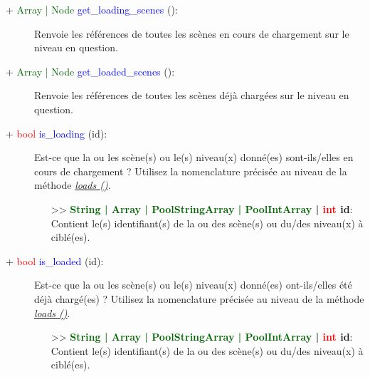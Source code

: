 \documentclass[a4paper, 11pt]{article}
\begin{document}
	\begin{description}
		\item [+ \textcolor{darkgreen}{Array | Node} \textcolor{blue}{get\_loading\_scenes} ():] Renvoie les
		références de toutes les scènes en cours de chargement sur le niveau en question.\\
	\end{description}
	\begin{description}
		\item [+ \textcolor{darkgreen}{Array | Node} \textcolor{blue}{get\_loaded\_scenes} ():] Renvoie les
		références de toutes les scènes déjà chargées sur le niveau en question.\\
	\end{description}
	\begin{description}
		\item [+ \textcolor{red}{bool} \textcolor{blue}{is\_loading} (id):] Est-ce que la ou les scène(s) ou 
		le(s) niveau(x) donné(es) sont-ils/elles en cours de chargement ? Utilisez la nomenclature précisée 
		au niveau de la méthode \textit{\hyperlink{load}{loads ()}}.
		\begin{itemize}
			\item [>> \textbf{\textcolor{darkgreen}{String | Array | PoolStringArray | PoolIntArray} |
			\textcolor{red}{int} id}:] Contient le(s) identifiant(s) de la ou des scène(s) ou du/des
			niveau(x) à ciblé(es).\\
		\end{itemize}
	\end{description}
	\begin{description}
		\item [+ \textcolor{red}{bool} \textcolor{blue}{is\_loaded} (id):] Est-ce que la ou les scène(s) ou 
		le(s) niveau(x) donné(es) ont-ils/elles été déjà chargé(es) ?  Utilisez la nomenclature précisée 
		au niveau de la méthode \textit{\hyperlink{load}{loads ()}}.
		\begin{itemize}
			\item [>> \textbf{\textcolor{darkgreen}{String | Array | PoolStringArray | PoolIntArray} |
			\textcolor{red}{int} id}:] Contient le(s) identifiant(s) de la ou des scène(s) ou du/des
			niveau(x) à ciblé(es).\\
		\end{itemize}
	\end{description}
\end{document}
